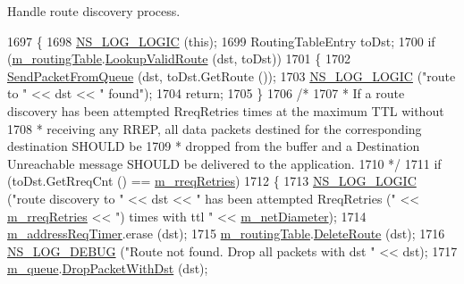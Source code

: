 Handle route discovery process. 


\begin{DoxyCode}
1697 \{
1698   \hyperlink{group__logging_ga88acd260151caf2db9c0fc84997f45ce}{NS\_LOG\_LOGIC} (\textcolor{keyword}{this});
1699   RoutingTableEntry toDst;
1700   \textcolor{keywordflow}{if} (\hyperlink{classns3_1_1aodv_1_1RoutingProtocol_a4e1003a34c8adc96db71096d88c98ae0}{m\_routingTable}.\hyperlink{classns3_1_1aodv_1_1RoutingTable_a2ca8c3757223d681d4cc39e2028fa7ad}{LookupValidRoute} (dst, toDst))
1701     \{
1702       \hyperlink{classns3_1_1aodv_1_1RoutingProtocol_a7cd2a3baf7b377fbbf85de4275164f2b}{SendPacketFromQueue} (dst, toDst.GetRoute ());
1703       \hyperlink{group__logging_ga88acd260151caf2db9c0fc84997f45ce}{NS\_LOG\_LOGIC} (\textcolor{stringliteral}{"route to "} << dst << \textcolor{stringliteral}{" found"});
1704       \textcolor{keywordflow}{return};
1705     \}
1706   \textcolor{comment}{/*}
1707 \textcolor{comment}{   *  If a route discovery has been attempted RreqRetries times at the maximum TTL without}
1708 \textcolor{comment}{   *  receiving any RREP, all data packets destined for the corresponding destination SHOULD be}
1709 \textcolor{comment}{   *  dropped from the buffer and a Destination Unreachable message SHOULD be delivered to the application.}
1710 \textcolor{comment}{   */}
1711   \textcolor{keywordflow}{if} (toDst.GetRreqCnt () == \hyperlink{classns3_1_1aodv_1_1RoutingProtocol_abecbe245cb328bc299a47f9a8a89aa6e}{m\_rreqRetries})
1712     \{
1713       \hyperlink{group__logging_ga88acd260151caf2db9c0fc84997f45ce}{NS\_LOG\_LOGIC} (\textcolor{stringliteral}{"route discovery to "} << dst << \textcolor{stringliteral}{" has been attempted RreqRetries ("} << 
      \hyperlink{classns3_1_1aodv_1_1RoutingProtocol_abecbe245cb328bc299a47f9a8a89aa6e}{m\_rreqRetries} << \textcolor{stringliteral}{") times with ttl "} << \hyperlink{classns3_1_1aodv_1_1RoutingProtocol_a563c2234b89a44628f8e71b38e7c60ec}{m\_netDiameter});
1714       \hyperlink{classns3_1_1aodv_1_1RoutingProtocol_a3e21cac8acb05e13339eb0cabf13ddcf}{m\_addressReqTimer}.erase (dst);
1715       \hyperlink{classns3_1_1aodv_1_1RoutingProtocol_a4e1003a34c8adc96db71096d88c98ae0}{m\_routingTable}.\hyperlink{classns3_1_1aodv_1_1RoutingTable_aec4efdf9faa7e90a825879bc86cc813a}{DeleteRoute} (dst);
1716       \hyperlink{group__logging_ga413f1886406d49f59a6a0a89b77b4d0a}{NS\_LOG\_DEBUG} (\textcolor{stringliteral}{"Route not found. Drop all packets with dst "} << dst);
1717       \hyperlink{classns3_1_1aodv_1_1RoutingProtocol_afd2e6004e54cac8abd2d95cec3ee9580}{m\_queue}.\hyperlink{classns3_1_1aodv_1_1RequestQueue_ac133e18007238865cda0bc74b6b59f50}{DropPacketWithDst} (dst);

\end{DoxyCode}
